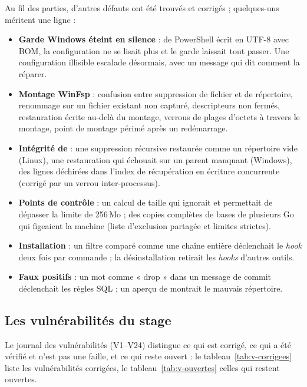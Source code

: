 Au fil des parties, d'autres défauts ont été trouvés et corrigés ; quelques-uns méritent une
ligne :
\begin{itemize}
  \item \textbf{Garde Windows éteint en silence} :  de PowerShell écrit en UTF-8 avec
    BOM, la configuration ne se lisait plus et le garde laissait tout passer. Une configuration
    illisible escalade désormais, avec un message qui dit comment la réparer.
  \item \textbf{Montage WinFsp} : confusion entre suppression de fichier et de répertoire,
    renommage sur un fichier existant non capturé, descripteurs non fermés, restauration écrite
    au-delà du montage, verrous de plages d'octets à travers le montage, point de montage périmé
    après un redémarrage.
  \item \textbf{Intégrité de } : une suppression récursive restaurée comme un répertoire
    vide (Linux), une restauration qui échouait sur un parent manquant (Windows), des lignes
    déchirées dans l'index de récupération en écriture concurrente (corrigé par un verrou
    inter-processus).
  \item \textbf{Points de contrôle} : un calcul de taille qui ignorait  et
    permettait de dépasser la limite de 256\,Mo ; des copies complètes de bases de plusieurs Go
    qui figeaient la machine (liste d'exclusion partagée et limites strictes).
  \item \textbf{Installation} : un filtre  comparé comme une chaîne entière
    déclenchait le \textit{hook} deux fois par commande ; la désinstallation retirait les
    \textit{hooks} d'autres outils.
  \item \textbf{Faux positifs} : un mot comme « drop » dans un message de commit déclenchait les
    règles SQL ; un aperçu de  montrait le mauvais répertoire.
\end{itemize}

\subsection{Les vulnérabilités du stage}
Le journal des vulnérabilités (V1--V24) distingue ce qui est corrigé, ce qui a été vérifié et
n'est pas une faille, et ce qui reste ouvert : le tableau~\ref{tab:v-corrigees} liste les
vulnérabilités corrigées, le tableau~\ref{tab:v-ouvertes} celles qui restent ouvertes.

